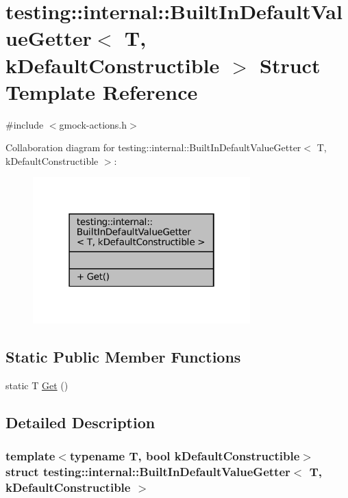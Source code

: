\hypertarget{structtesting_1_1internal_1_1BuiltInDefaultValueGetter}{}\section{testing\+:\+:internal\+:\+:Built\+In\+Default\+Value\+Getter$<$ T, k\+Default\+Constructible $>$ Struct Template Reference}
\label{structtesting_1_1internal_1_1BuiltInDefaultValueGetter}


{\ttfamily \#include $<$gmock-\/actions.\+h$>$}



Collaboration diagram for testing\+:\+:internal\+:\+:Built\+In\+Default\+Value\+Getter$<$ T, k\+Default\+Constructible $>$\+:
\nopagebreak
\begin{figure}[H]
\begin{center}
\leavevmode
\includegraphics[width=238pt]{structtesting_1_1internal_1_1BuiltInDefaultValueGetter__coll__graph}
\end{center}
\end{figure}
\subsection*{Static Public Member Functions}
\begin{DoxyCompactItemize}
\item 
static T \hyperlink{structtesting_1_1internal_1_1BuiltInDefaultValueGetter_a61c47c50cdb6ab488dabe2cec3b97fc8}{Get} ()
\end{DoxyCompactItemize}


\subsection{Detailed Description}
\subsubsection*{template$<$typename T, bool k\+Default\+Constructible$>$\newline
struct testing\+::internal\+::\+Built\+In\+Default\+Value\+Getter$<$ T, k\+Default\+Constructible $>$}




